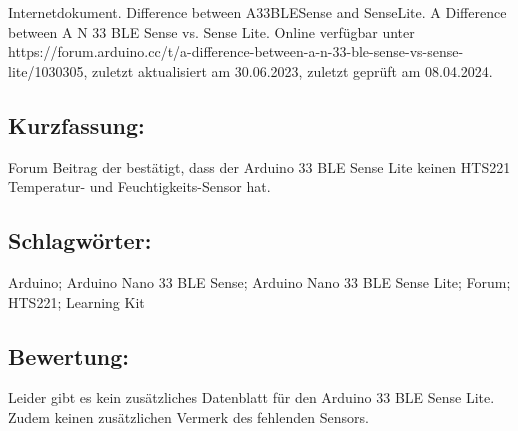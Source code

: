 \hfill
\begin{minipage}{0.48\textwidth}
Internetdokument. Difference between A33BLESense and SenseLite. A Difference between A N 33 BLE Sense vs. Sense Lite. Online verfügbar unter https://forum.arduino.cc/t/a-difference-between-a-n-33-ble-sense-vs-sense-lite/1030305, zuletzt aktualisiert am 30.06.2023, zuletzt geprüft am 08.04.2024.
\subsection*{Kurzfassung:}
Forum Beitrag der bestätigt, dass der Arduino 33 BLE Sense Lite keinen HTS221 Temperatur- und Feuchtigkeits-Sensor hat.
\end{minipage}
\subsection*{Schlagwörter:}
Arduino; Arduino Nano 33 BLE Sense; Arduino Nano 33 BLE Sense Lite; Forum; HTS221; Learning Kit
\subsection*{Bewertung:}
Leider gibt es kein zusätzliches Datenblatt für den Arduino 33 BLE Sense Lite. Zudem keinen zusätzlichen Vermerk des fehlenden Sensors.

